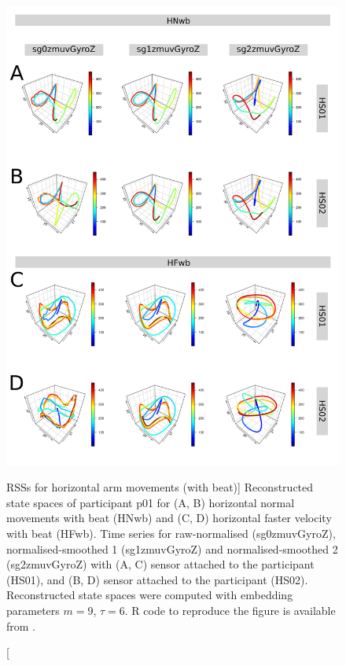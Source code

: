 \begin{figure}
\centering
\includegraphics[height=0.8\textheight]{rss_Hwb_w500}
\caption
	[RSSs for horizontal arm movements (with beat)]{
	Reconstructed state spaces of participant p01 for 
	(A, B) horizontal normal movements with beat (HNwb) and 
	(C, D) horizontal faster velocity with beat (HFwb).
	Time series for raw-normalised (sg0zmuvGyroZ), 
	normalised-smoothed 1 (sg1zmuvGyroZ) and 
	normalised-smoothed 2 (sg2zmuvGyroZ) with
	(A, C) sensor attached to the participant (HS01), and
	(B, D) sensor attached to the participant (HS02).	
	Reconstructed state spaces were computed with 
	embedding parameters $m=9$, $\tau=6$.
	R code to reproduce the figure is available from \cite{hwum2018}.
        }
     \label{fig:rss_Hwb_w500}
\end{figure}



